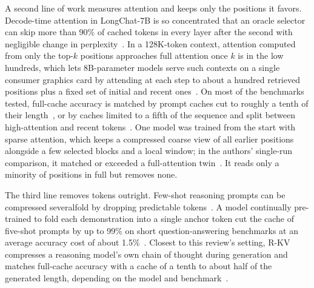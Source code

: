 \documentclass{ieeeaccess}
\begin{document}
A second line of work measures attention and keeps only the positions it favors. Decode-time attention in LongChat-7B is so concentrated that an oracle selector can skip more than 90\% of cached tokens in every layer after the second with negligible change in perplexity~\cite{tang2024quest}. In a 128K-token context, attention computed from only the top-$k$ positions approaches full attention once $k$ is in the low hundreds, which lets 8B-parameter models serve such contexts on a single consumer graphics card by attending at each step to about a hundred retrieved positions plus a fixed set of initial and recent ones~\cite{liu2024retrieval}. On most of the benchmarks tested, full-cache accuracy is matched by prompt caches cut to roughly a tenth of their length~\cite{li2024snapkv,cai2024pyramidkv}, or by caches limited to a fifth of the sequence and split between high-attention and recent tokens~\cite{zhang2023h2o}. One model was trained from the start with sparse attention, which keeps a compressed coarse view of all earlier positions alongside a few selected blocks and a local window; in the authors' single-run comparison, it matched or exceeded a full-attention twin~\cite{yuan2025nsa}. It reads only a minority of positions in full but removes none.

The third line removes tokens outright. Few-shot reasoning prompts can be compressed severalfold by dropping predictable tokens~\cite{jiang2023llmlingua}. A model continually pre-trained to fold each demonstration into a single anchor token cut the cache of five-shot prompts by up to 99\% on short question-answering benchmarks at an average accuracy cost of about 1.5\%~\cite{pang2024anchor}. Closest to this review's setting, R-KV compresses a reasoning model's own chain of thought during generation and matches full-cache accuracy with a cache of a tenth to about half of the generated length, depending on the model and benchmark~\cite{cai2025rkv}.
\end{document}
